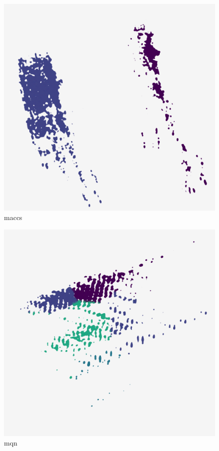 \begin{subfigure}[b]{.25\linewidth}
    \centering
    \includegraphics[width=\textwidth]{outputs/DRplots/plots/PCA_maccs.png}
    \caption{maccs}
    \label{fig:PCA_maccs}
\end{subfigure}
\begin{subfigure}[b]{.25\linewidth}
    \centering
    \includegraphics[width=\textwidth]{outputs/DRplots/plots/PCA_mqn.png}
    \caption{mqn}
    \label{fig:PCA_mqn}
\end{subfigure}
